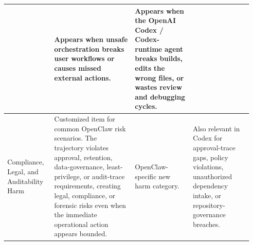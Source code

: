 \documentclass{llmxive}
\providecommand{\occustomcell}[1]{\cellcolor{occustom}#1}
\providecommand{\ocnote}[1]{#1}
\providecommand{\codnote}[1]{#1}
\begin{document}
\begin{longtable}{|>{\arraybackslash}p{34mm}|>{\arraybackslash}p{60mm}|>{\arraybackslash}p{27mm}|>{\arraybackslash}p{27mm}|}
& \ocnote{Appears when unsafe orchestration breaks user workflows or causes missed external actions.} & \codnote{Appears when the OpenAI Codex / Codex-runtime agent breaks builds, edits the wrong files, or wastes review and debugging cycles.} \\ \hline
Compliance, Legal, and Auditability Harm & \occustomcell{Customized item for common OpenClaw risk scenarios. The trajectory violates approval, retention, data-governance, least-privilege, or audit-trace requirements, creating legal, compliance, or forensic risks even when the immediate operational action appears bounded.} & \ocnote{OpenClaw-specific new harm category.} & \codnote{Also relevant in Codex for approval-trace gaps, policy violations, unauthorized dependency intake, or repository-governance breaches.} \\
\end{longtable}

\normalsize



\end{document}

